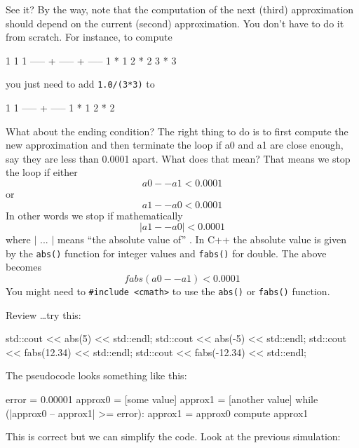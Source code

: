 See it? By the way, note that the computation of the next (third)
approximation should depend on the current (second) approximation. You
don't have to do it from scratch. For instance, to
compute
\begin{console}
  1       1       1
----- + ----- + -----
1 * 1   2 * 2   3 * 3
\end{console}
you just need to add \texttt{1.0/(3*3)} to
\begin{console}
  1       1
----- + -----
1 * 1   2 * 2
\end{console}
What about the ending condition? The right thing to do is to first
compute the new approximation and then terminate the loop if a0 and a1
are close enough, say they are less than 0.0001 apart. What does that
mean? That means we stop the loop if either
\[a0 -- a1 < 0.0001\]
or
\[a1 -- a0 < 0.0001\]
In other words we stop if mathematically
\[
| a1 -- a0 | < 0.0001
\]
where $|$ ... $|$ means ``the absolute value of'' . In C++ the absolute value is given by the \texttt{abs()} function for integer values and \texttt{fabs()} for double. The above becomes
\[
fabs(a0 -- a1) < 0.0001
\]
You might need to \texttt{\#include <cmath>} to use the \texttt{abs()} or \texttt{fabs()} function.

\begin{ex} Review \ldots try this:
\begin{console}
std::cout << abs(5) << std::endl;
std::cout << abs(-5) << std::endl;
std::cout << fabs(12.34) << std::endl;
std::cout << fabs(-12.34) << std::endl; 
\end{console}

The pseudocode looks something like this:
\begin{console}
error = 0.00001
approx0 = [some value]
approx1 = [another value]
while (|approx0 -- approx1| >= error):
      approx1 = approx0
      compute approx1 
\end{console}
\end{ex}
This is correct but we can simplify the code. Look at the previous
simulation:


